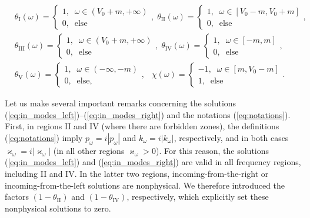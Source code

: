 \documentclass[12pt]{article}
\newcommand\beq{\begin{equation}}
\newcommand\eeq{\end{equation}}
\def\kw{k_{\omega}} \def\pw{p_{\omega}}
\def\I{\mathrm{I}}
\def\II{\mathrm{II}}
\def\III{\mathrm{III}}
\def\IV{\mathrm{IV}}
\def\V{\mathrm{V}}
\numberwithin{equation}{section}
\begin{document}
\beq\label{eq:theta_functions}
\begin{aligned}
    &\theta_{\I}(\omega) = \begin{cases}
        1, \;\;\omega\in (V_0+m,+\infty)\\
        0,\;\;\text{else}
    \end{cases},\;
    \theta_{\II}(\omega) = \begin{cases}
        1, \;\;\omega\in \left[V_0-m,V_0+m\right]\\
        0,\;\;\text{else}
    \end{cases},\\
    &\theta_{\III}(\omega) = \begin{cases}
        1, \;\;\omega\in (V_0+m,+\infty)\\
        0,\;\;\text{else}
    \end{cases},\;
    \theta_{\IV}(\omega) = \begin{cases}
        1, \;\;\omega\in \left[-m,m\right]\\
        0,\;\;\text{else}
    \end{cases},\\
    &\theta_{\V}(\omega) = \begin{cases}
        1, \;\;\omega\in (-\infty,-m)\\
        0,\;\;\text{else},
    \end{cases},\
    \;\;
    \chi(\omega) = \begin{cases}
        -1, \;\;\omega\in \left[m, V_0-m\right]\\
        1,\;\;\text{else}
    \end{cases}.
\end{aligned}
\eeq

Let us make several important remarks concerning the solutions (\ref{eq:in_modes_left})–(\ref{eq:in_modes_right}) and the notations (\ref{eq:notations}). First, in regions II and IV (where there are forbidden zones), the definitions (\ref{eq:notations}) imply $\pw=i|\pw|$ and $\kw=i|\kw|$, respectively, and in both cases $\varkappa_{\omega} = i|\varkappa_{\omega}|$ (in all other regions $\varkappa_{\omega}>0$). For this reason, the solutions (\ref{eq:in_modes_left}) and (\ref{eq:in_modes_right}) are valid in all frequency regions, including II and IV. In the latter two regions, incoming-from-the-right or incoming-from-the-left solutions are nonphysical. We therefore introduced the factors $(1-\theta_{\II})$ and $(1-\theta_{\IV})$, respectively, which explicitly set these nonphysical solutions to zero.
\end{document}
